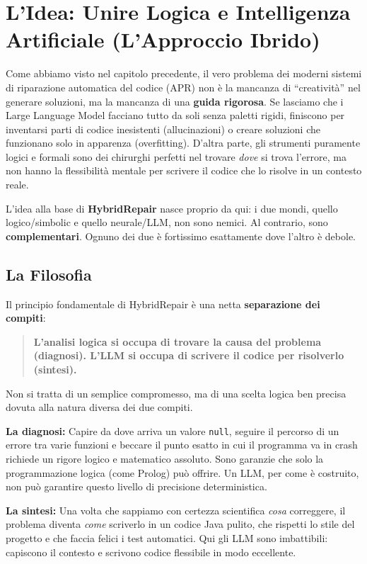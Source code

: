 \chapter{L'Idea: Unire Logica e Intelligenza Artificiale (L'Approccio Ibrido)}

Come abbiamo visto nel capitolo precedente, il vero problema dei moderni sistemi di 
riparazione automatica del codice (APR) non è la mancanza di ``creatività'' nel generare 
soluzioni, ma la mancanza di una \textbf{guida rigorosa}. Se lasciamo che i Large Language 
Model  facciano tutto da soli senza paletti rigidi, finiscono per inventarsi parti di codice inesistenti 
(allucinazioni) o creare soluzioni che funzionano solo in apparenza (overfitting). 
D'altra parte, gli strumenti puramente logici e formali sono dei chirurghi perfetti nel trovare 
\textit{dove} si trova l'errore, ma non hanno la flessibilità mentale per scrivere il codice che 
lo risolve in un contesto reale.

L'idea alla base di \textbf{HybridRepair} nasce proprio da qui: i due mondi, quello logico/simbolic
 e quello neurale/LLM, non sono nemici. Al contrario, sono \textbf{complementari}. Ognuno dei due è 
 fortissimo esattamente dove l'altro è debole.

\section{La Filosofia}

Il principio fondamentale di HybridRepair è una netta \textbf{separazione dei compiti}:

\begin{quote}
\textbf{L'analisi logica si occupa di trovare la causa del problema (diagnosi). L'LLM si occupa di scrivere il codice per risolverlo (sintesi).}
\end{quote}

Non si tratta di un semplice compromesso, ma di una scelta logica ben precisa dovuta alla natura diversa 
dei due compiti.

\textbf{La diagnosi:} Capire da dove arriva un valore \texttt{null}, seguire il 
percorso di un errore tra varie funzioni e beccare il punto esatto in cui il programma va in crash 
richiede un rigore logico e matematico assoluto. Sono garanzie che solo la programmazione logica 
(come Prolog) può offrire. Un LLM, per come è costruito, non può garantire questo livello 
di precisione deterministica.

\textbf{La sintesi:} Una volta che sappiamo con certezza scientifica \textit{cosa} 
correggere, il problema diventa \textit{come} scriverlo in un codice Java pulito, che rispetti lo 
stile del progetto e che faccia felici i test automatici. Qui gli LLM sono imbattibili: capiscono 
il contesto e scrivono codice flessibile in modo eccellente.

